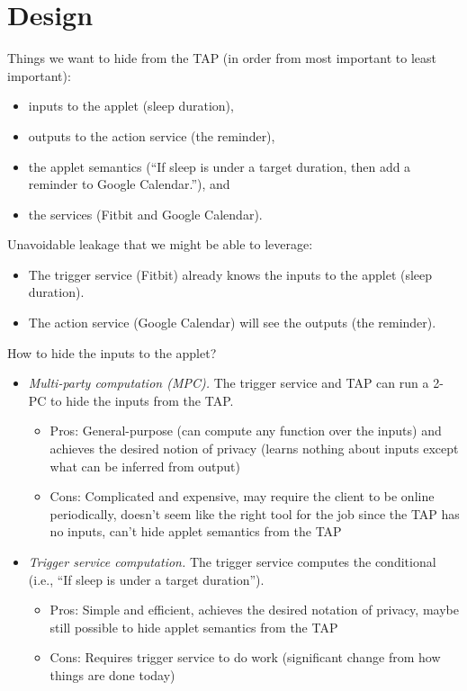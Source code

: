 \section{Design}
\label{sec:design}

Things we want to hide from the TAP (in order from most important to least
important):
\begin{itemize}[leftmargin=*]
  \item inputs to the applet (sleep duration),
  \item outputs to the action service (the reminder),
  \item the applet semantics (``If sleep is under a target duration, then add a
    reminder to Google Calendar.''), and
  \item the services (Fitbit and Google Calendar).
\end{itemize}\bigskip

Unavoidable leakage that we might be able to leverage:
\begin{itemize}[leftmargin=*]
  \item The trigger service (Fitbit) already knows the inputs to the applet
    (sleep duration).
  \item The action service (Google Calendar) will see the outputs (the
    reminder).
\end{itemize}\bigskip

How to hide the inputs to the applet?
\begin{itemize}[leftmargin=*]
  \item \emph{Multi-party computation (MPC).} The trigger service and TAP can
    run a 2-PC to hide the inputs from the TAP.
    \begin{itemize}
      \item Pros: General-purpose (can compute any function over the inputs) and
        achieves the desired notion of privacy (learns nothing about inputs
        except what can be inferred from output)
      \item Cons: Complicated and expensive, may require the client to be online
        periodically, doesn't seem like the right tool for the job since the TAP
        has no inputs, can't hide applet semantics from the TAP
    \end{itemize}
  \item \emph{Trigger service computation.} The trigger service computes the
    conditional (i.e., ``If sleep is under a target duration'').
    \begin{itemize}
      \item Pros: Simple and efficient, achieves the desired notation of
        privacy, maybe still possible to hide applet semantics from the TAP
      \item Cons: Requires trigger service to do work (significant change from
        how things are done today)
    \end{itemize}
\end{itemize}\bigskip

